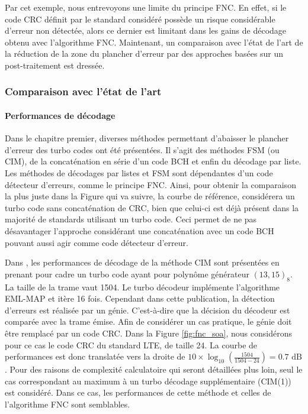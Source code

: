 Par cet exemple, nous entrevoyons une limite du principe FNC. En effet, si le code CRC définit par le standard considéré 
possède un risque considérable d'erreur non détectée, alors ce dernier est limitant dans les gains de décodage obtenu
avec l'algorithme FNC. Maintenant, un comparaison avec l'état de l'art de la réduction de la zone du plancher d'erreur 
par des approches basées sur un post-traitement est dressée.

\subsubsection{Comparaison avec l'état de l'art}
\paragraph*{Performances de décodage}
Dans le chapitre premier, diverses méthodes permettant d'abaisser le plancher d'erreur des turbo codes ont été présentées.
Il s'agit des méthodes FSM (ou CIM), de la concaténation en série d'un code BCH et enfin du décodage par liste. 
Les méthodes de décodages par listes et FSM sont dépendantes d'un code détecteur d'erreurs, comme le principe FNC. Ainsi, 
pour obtenir la comparaison la plus juste dans la Figure qui va suivre, la courbe de référence, considérera un turbo code 
sans concaténation de CRC, bien que celui-ci est déjà présent dans la majorité de standards utilisant un turbo code. 
Ceci permet de ne pas désavantager l'approche considérant une concaténation avec un code BCH pouvant aussi agir comme 
code détecteur d'erreur.

Dans \cite{cim}, les performances de décodage de la méthode CIM sont présentées en prenant pour cadre un turbo code ayant pour
polynôme générateur $(13,15)_8$. La taille de la trame vaut 1504. Le turbo décodeur implémente l'algorithme EML-MAP et
itère 16 fois. Cependant dans cette publication, la détection d'erreurs est réalisée par un génie. C'est-à-dire
que la décision du décodeur est comparée avec la trame émise. Afin de considérer un cas pratique, le génie doit être remplacé
par un code CRC. Dans la Figure \ref{fig:fnc_soa}, nous considérons pour ce cas le code CRC du standard LTE, de taille 24.
La courbe de performances est donc translatée vers la droite de $10\times\log_{10}\left(\frac{1504}{1504-24}\right)=0.7\text{ dB}$.
Pour des raisons de complexité calculatoire qui seront détaillées plus loin, seul le cas correspondant au maximum à un 
turbo décodage supplémentaire (CIM(1)) est considéré. Dans ce cas, les performances de cette méthode et celles de l'algorithme
FNC sont semblables.

